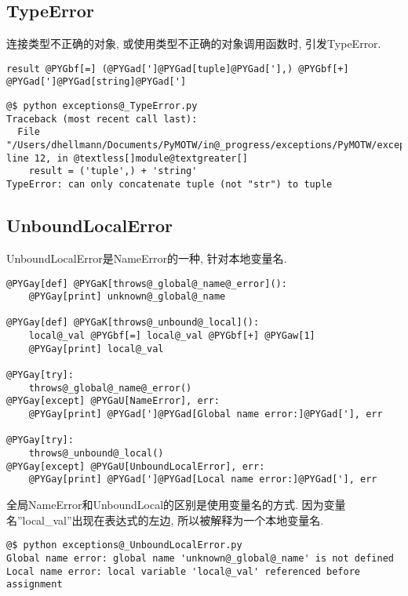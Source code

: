 \documentclass[a4paper,10pt,english]{manual}
\begin{document}
\subsection{TypeError}

连接类型不正确的对象, 或使用类型不正确的对象调用函数时, 引发TypeError.

\begin{Verbatim}[commandchars=@\[\]]
result @PYGbf[=] (@PYGad[']@PYGad[tuple]@PYGad['],) @PYGbf[+] @PYGad[']@PYGad[string]@PYGad[']
\end{Verbatim}

\begin{Verbatim}[commandchars=@\[\]]
@$ python exceptions@_TypeError.py
Traceback (most recent call last):
  File "/Users/dhellmann/Documents/PyMOTW/in@_progress/exceptions/PyMOTW/exceptions/exceptions@_TypeError.py", line 12, in @textless[]module@textgreater[]
    result = ('tuple',) + 'string'
TypeError: can only concatenate tuple (not "str") to tuple
\end{Verbatim}


\subsection{UnboundLocalError}

UnboundLocalError是NameError的一种, 针对本地变量名.

\begin{Verbatim}[commandchars=@\[\]]
@PYGay[def] @PYGaK[throws@_global@_name@_error]():
    @PYGay[print] unknown@_global@_name

@PYGay[def] @PYGaK[throws@_unbound@_local]():
    local@_val @PYGbf[=] local@_val @PYGbf[+] @PYGaw[1]
    @PYGay[print] local@_val

@PYGay[try]:
    throws@_global@_name@_error()
@PYGay[except] @PYGaU[NameError], err:
    @PYGay[print] @PYGad[']@PYGad[Global name error:]@PYGad['], err

@PYGay[try]:
    throws@_unbound@_local()
@PYGay[except] @PYGaU[UnboundLocalError], err:
    @PYGay[print] @PYGad[']@PYGad[Local name error:]@PYGad['], err
\end{Verbatim}

全局NameError和UnboundLocal的区别是使用变量名的方式. 因为变量名''local\_val''出现在表达式的左边, 所以被解释为一个本地变量名.

\begin{Verbatim}[commandchars=@\[\]]
@$ python exceptions@_UnboundLocalError.py
Global name error: global name 'unknown@_global@_name' is not defined
Local name error: local variable 'local@_val' referenced before assignment
\end{Verbatim}
\end{document}
